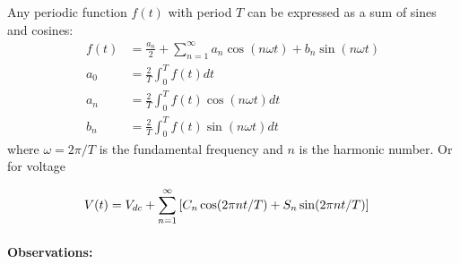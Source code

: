 \documentclass[../main.tex]{subfiles}
\begin{document}
Any periodic function $f(t)$ with period $T$ can be expressed as a sum of sines and cosines:
\begin{align*}
    f(t) &= \frac{a_n}{2} + \sum_{n=1}^{\infty} a_n \cos(n\omega t) + b_n \sin(n\omega t)\\
    a_0 &= \frac{2}{T} \int_{0}^{T} f(t) dt\\
    a_n &= \frac{2}{T} \int_{0}^{T} f(t) \cos(n\omega t) dt\\
    b_n &= \frac{2}{T} \int_{0}^{T} f(t) \sin(n\omega t) dt
\end{align*}
where $\omega = 2\pi/T$ is the fundamental frequency and $n$ is the harmonic number. Or for voltage

\begin{align}
    V(t) &= V_{dc} + \sum_{n=1}^\infty \qt[C_n \cos(2\pi n t/T) + S_n \sin(2\pi n t/T)]
\end{align}
\paragraph*{Observations:}
\end{document}
